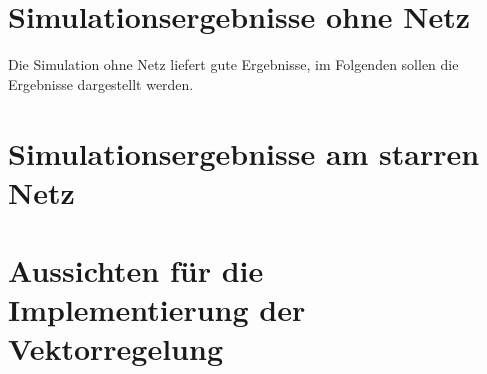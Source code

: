 \section{Simulationsergebnisse ohne Netz}\label{sec:sim-ohne-netz}

Die Simulation ohne Netz liefert gute Ergebnisse, im Folgenden sollen die Ergebnisse dargestellt werden.


\section{Simulationsergebnisse am starren Netz}\label{sec:sim-starr-netz}


\section{Aussichten für die Implementierung der Vektorregelung}\label{sec:aussichten-foc}





